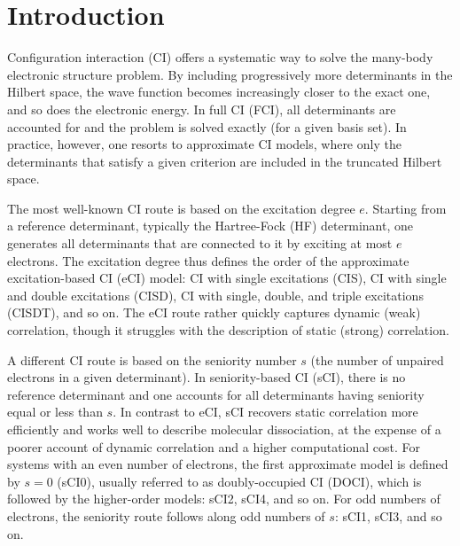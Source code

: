 \documentclass[aip,jcp,reprint,noshowkeys,superscriptaddress]{revtex4-1}
\begin{document}
\section{Introduction}
\label{sec:intro}

Configuration interaction (CI) offers a systematic way to solve the many-body electronic structure problem. \cite{SzaboBook,Helgakerbook}
By including progressively more determinants in the Hilbert space, the wave function becomes increasingly closer to the exact one, and so does the electronic energy.
In full CI (FCI), all determinants are accounted for and the problem is solved exactly (for a given basis set).
In practice, however, one resorts to approximate CI models, where only the determinants that satisfy a given criterion are included in the truncated Hilbert space.

The most well-known CI route is based on the excitation degree $e$.
Starting from a reference determinant, typically the Hartree-Fock (HF) determinant,
one generates all determinants that are connected to it by exciting at most $e$ electrons.
The excitation degree thus defines the order of the approximate excitation-based CI (eCI) model:
CI with single excitations (CIS), CI with single and double excitations (CISD), CI with single, double, and triple excitations (CISDT), and so on.
The eCI route rather quickly captures dynamic (weak) correlation, though it struggles with the description of static (strong) correlation.

A different CI route is based on the seniority number $s$ (the number of unpaired electrons in a given determinant).
In seniority-based CI (sCI), \cite{Bytautas_2011,Allen_1962,Smith_1965,Veillard_1967} there is no reference determinant and one accounts for all determinants having seniority equal or less than $s$.
In contrast to eCI, sCI recovers static correlation more efficiently and works well to describe molecular dissociation, \cite{Bytautas_2015,Alcoba_2014,Alcoba_2014b}
at the expense of a poorer account of dynamic correlation and a higher computational cost.
For systems with an even number of electrons, the first approximate model is defined by $s=0$ (sCI0), usually referred to as doubly-occupied CI (DOCI),
which is followed by the higher-order models: sCI2, sCI4, and so on.
For odd numbers of electrons, the seniority route follows along odd numbers of $s$: sCI1, sCI3, and so on.
\end{document}
